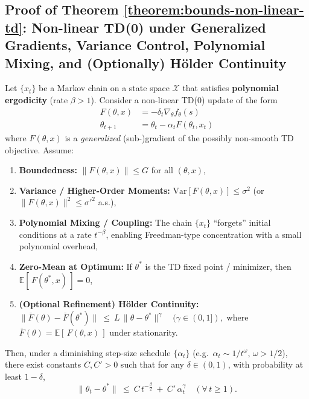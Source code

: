 \subsection{Proof of Theorem \ref{theorem:bounds-non-linear-td}:
Non-linear TD(0) under Generalized Gradients, Variance Control, Polynomial Mixing, and (Optionally) H\"older Continuity}
\label{app:proof-bounds-non-linear-td-merged}

\begin{theoremapp*}
Let $\{x_t\}$ be a Markov chain on a state space $\mathcal{X}$ that satisfies \textbf{polynomial ergodicity} (rate $\beta>1$). 
Consider a non-linear TD(0) update of the form
\begin{align}
F(\theta, x) &= -\delta_t \nabla_\theta f_\theta(s)\\
\theta_{t+1} &= \theta_t - \alpha_t F(\theta_t, x_t)
\end{align}
where $F(\theta,x)$ is a \emph{generalized} (sub-)gradient of the possibly non-smooth TD objective.  Assume:
\begin{enumerate}
\item \textbf{Boundedness:} $\|F(\theta,x)\|\le G$ for all $(\theta,x)$,
\item \textbf{Variance / Higher-Order Moments:} $\mathrm{Var}[F(\theta,x)]\le \sigma^2$ (or $\|F(\theta,x)\|^2 \le \sigma'^2$ a.s.),
\item \textbf{Polynomial Mixing / Coupling:} The chain $\{x_t\}$ “forgets” initial conditions at a rate $t^{-\beta}$, enabling Freedman-type concentration with a small polynomial overhead,
\item \textbf{Zero-Mean at Optimum:} If $\theta^*$ is the TD fixed point / minimizer, then $\mathbb{E}[\,F(\theta^*,x)\,] = 0$,
\item \textbf{(Optional Refinement) H\"older Continuity:} 
\(
  \|\overline{F}(\theta) - \overline{F}(\theta^*)\|
  ~\le~
  L\,\|\theta - \theta^*\|^\gamma
  \quad(\gamma\in(0,1]),
\)
where $\overline{F}(\theta)=\mathbb{E}[\,F(\theta,x)\,]$ under stationarity.
\end{enumerate}
Then, under a diminishing step-size schedule $\{\alpha_t\}$ (e.g.\ $\alpha_t\sim 1/t^\omega,\,\omega>1/2$), there exist constants $C,C'>0$ such that for any $\delta\in(0,1)$, with probability at least $1-\delta$,
\[
  \|\theta_t - \theta^*\|
  ~\le~
  C\,t^{-\tfrac{\beta}{2}}
  ~+~
  C'\,\alpha_t^\gamma
  \quad
  (\forall\,t\ge1).
\]
\end{theoremapp*}

